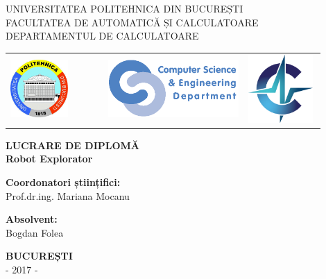 \thispagestyle{empty}
\begin{center}

{\large
    UNIVERSITATEA POLITEHNICA DIN BUCUREȘTI \\
    FACULTATEA DE AUTOMATICĂ ȘI CALCULATOARE \\
    DEPARTAMENTUL DE CALCULATOARE \\
}


\begin{tabular}{m{0.28\linewidth}m{0.4\linewidth}m{0.22\linewidth}}
\center \includegraphics[height=2.2cm]{figuri/upb-logo.png} &
\center \includegraphics[height=2.2cm]{figuri/cs-logo.png} &
\center \includegraphics[height=2.6cm]{figuri/acs-logo.png}
\end{tabular}


{\LARGE
	\textbf{LUCRARE DE DIPLOMĂ}\\
	\textbf{Robot Explorator}
}


{\large
    \begin{multicols}{2}
        \begin{flushleft}
        \textbf{Coordonatori științifici:}\\
        Prof.dr.ing. Mariana Mocanu\\
        \end{flushleft}
    \columnbreak
        \begin{flushright}
        \textbf{Absolvent:}\\
        Bogdan Folea
        \end{flushright}
    \end{multicols}
}


{\large
    \textbf{BUCUREȘTI\-\ \-\ \-\ }\\
    - 2017 -
}

\end{center}
